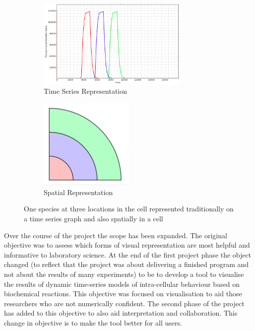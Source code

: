 \begin{figure}[h!]
    \centering
    \begin{subfigure}[b]{0.4\textwidth}
        \centering
        \includegraphics[width=0.8\textwidth]{images/asrc_graph_intro.png}
        \caption{Time Series Representation}
        \label{fig:asrc_graph_intro}
    \end{subfigure}
    \begin{subfigure}[b]{0.4\textwidth}
        \centering
        \includegraphics[width=0.5\textwidth]{images/asrc_cell_intro.png}
        \caption{Spatial Representation}
        \label{fig:asrc_cell_intro}
    \end{subfigure}
    \caption{One species at three locations in the cell represented traditionally on a time series graph and also spatially in a cell}
    \label{fig:asrc_intro}
\end{figure}


Over the course of the project the scope has been expanded.  The original objective was to assess which forms of visual representation are most helpful and informative to laboratory science.  At the end of the first project phase the object changed (to reflect that the project was about delivering a finished program and not about the results of many experiments) to be to develop a tool to visualise the results of dynamic time-series models of intra-cellular behaviour based on biochemical reactions.  This objective was focused on visualisation to aid those researchers who are not numerically confident.  The second phase of the project has added to this objective to also aid interpretation and collaboration.  This change in objective is to make the tool better for all users.

